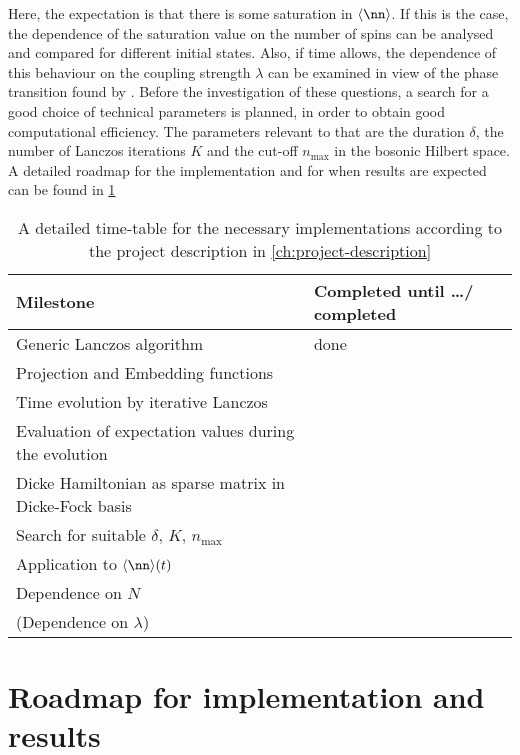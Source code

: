 Here, the expectation is that there is some saturation in \(\langle \nn \rangle\). 
If this is the case, the dependence of the saturation value on the number of spins can be analysed and compared for different initial states. 
Also, if time allows, the dependence of this behaviour on the coupling strength \(\lambda\) can be examined in view of the phase transition found by \textcite{heppSuperradiantPhaseTransition1973}.
Before the investigation of these questions, a search for a good choice of technical parameters is planned, in order to obtain good computational efficiency.
The parameters relevant to that are the duration \(\delta\), the number of Lanczos iterations \(K\) and the cut-off \(n_{\mathrm{max}}\) in the bosonic Hilbert space.
A detailed roadmap for the implementation and for when results are expected can be found in \cref{tab:roadmap}

\begin{table}
    \caption{A detailed time-table for the necessary implementations according to the project description in \cref{ch:project-description}}
    \label{tab:roadmap}
    \begin{tabular}{@{}ll@{}}
        \toprule
        Milestone & Completed until \dots / completed \\
        \midrule
        Generic Lanczos algorithm & done    \\
        Projection and Embedding functions & \\
        Time evolution by iterative Lanczos & \\
        Evaluation of expectation values during the evolution & \\
        Dicke Hamiltonian as sparse matrix in Dicke-Fock basis & \\
        Search for suitable \(\delta,\, K,\, n_{\mathrm{max}}\) & \\
        Application to \(\langle \nn \rangle (t)\) & \\
        Dependence on \(N\) & \\
        (Dependence on \(\lambda\)) & \\
        \bottomrule
    \end{tabular}
\end{table}

\appendix

\section{Roadmap for implementation and results}

